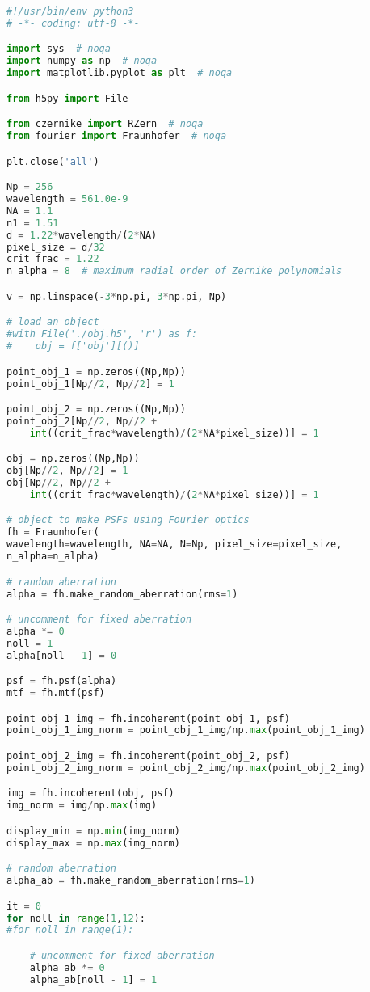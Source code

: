\begin{lstlisting}[language=Python]
#!/usr/bin/env python3
# -*- coding: utf-8 -*-

import sys  # noqa
import numpy as np  # noqa
import matplotlib.pyplot as plt  # noqa

from h5py import File

from czernike import RZern  # noqa
from fourier import Fraunhofer  # noqa

plt.close('all')

Np = 256
wavelength = 561.0e-9
NA = 1.1
n1 = 1.51
d = 1.22*wavelength/(2*NA)
pixel_size = d/32
crit_frac = 1.22
n_alpha = 8  # maximum radial order of Zernike polynomials

v = np.linspace(-3*np.pi, 3*np.pi, Np)

# load an object
#with File('./obj.h5', 'r') as f:
#    obj = f['obj'][()]

point_obj_1 = np.zeros((Np,Np))
point_obj_1[Np//2, Np//2] = 1

point_obj_2 = np.zeros((Np,Np))
point_obj_2[Np//2, Np//2 + 
	int((crit_frac*wavelength)/(2*NA*pixel_size))] = 1

obj = np.zeros((Np,Np))
obj[Np//2, Np//2] = 1
obj[Np//2, Np//2 + 
	int((crit_frac*wavelength)/(2*NA*pixel_size))] = 1

# object to make PSFs using Fourier optics
fh = Fraunhofer(
wavelength=wavelength, NA=NA, N=Np, pixel_size=pixel_size,
n_alpha=n_alpha)

# random aberration
alpha = fh.make_random_aberration(rms=1)

# uncomment for fixed aberration
alpha *= 0
noll = 1
alpha[noll - 1] = 0

psf = fh.psf(alpha)
mtf = fh.mtf(psf)

point_obj_1_img = fh.incoherent(point_obj_1, psf)
point_obj_1_img_norm = point_obj_1_img/np.max(point_obj_1_img)

point_obj_2_img = fh.incoherent(point_obj_2, psf)
point_obj_2_img_norm = point_obj_2_img/np.max(point_obj_2_img)

img = fh.incoherent(obj, psf)
img_norm = img/np.max(img)

display_min = np.min(img_norm)
display_max = np.max(img_norm)

# random aberration
alpha_ab = fh.make_random_aberration(rms=1)

it = 0
for noll in range(1,12):
#for noll in range(1):

	# uncomment for fixed aberration
	alpha_ab *= 0
	alpha_ab[noll - 1] = 1


\end{lstlisting}
